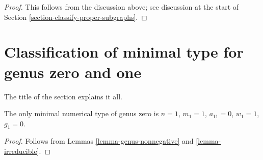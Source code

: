 \begin{proof}
This follows from the discussion above; see discussion at the
start of Section \ref{section-classify-proper-subgraphs}.
\end{proof}













\section{Classification of minimal type for genus zero and one}
\label{section-classification-genus-one}

\noindent
The title of the section explains it all.

\begin{lemma}
\label{lemma-genus-zero}
The only minimal numerical type of genus zero is
$n = 1$, $m_1 = 1$, $a_{11} = 0$, $w_1 = 1$, $g_1 = 0$.
\end{lemma}

\begin{proof}
Follows from Lemmas \ref{lemma-genus-nonnegative} and \ref{lemma-irreducible}.
\end{proof}

